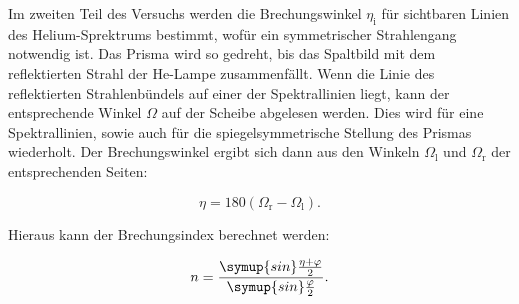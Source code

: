 Im zweiten Teil des Versuchs werden die Brechungswinkel $\eta_{\text{i}}$ für sichtbaren Linien des Helium-Sprektrums bestimmt, wofür ein symmetrischer Strahlengang notwendig ist. Das Prisma wird so gedreht, bis das Spaltbild mit dem reflektierten 
Strahl der He-Lampe zusammenfällt. Wenn die Linie des reflektierten Strahlenbündels auf einer der Spektrallinien liegt, kann der entsprechende Winkel $\Omega$ auf der Scheibe abgelesen werden. Dies wird für eine Spektrallinien, sowie auch für die spiegelsymmetrische
Stellung des Prismas wiederholt. Der Brechungswinkel ergibt sich dann aus den Winkeln $\Omega_{\text{l}}$ und $\Omega_{\text{r}}$ der entsprechenden Seiten:

\begin{equation}
\eta = 180 (\Omega_{\text{r}} - \Omega_{\text{l}}).
\end{equation}

Hieraus kann der Brechungsindex berechnet werden:

\begin{equation}
n = \frac{\symup{sin}\frac{\eta + \varphi}{2}}{\symup{sin}\frac{\varphi}{2}}.
\end{equation}